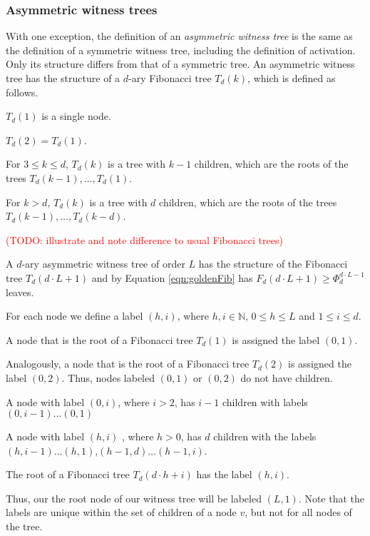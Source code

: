 \documentclass[a4paper,12pt]{article}
\newcommand\todo[1]{\textcolor{red}{(TODO: #1)}}
\begin{document}
\subsubsection{Asymmetric witness trees}
\label{sec:analysis:definitionAsymWT}
With one exception, the definition of an \emph{asymmetric witness tree} is the same as the definition of a symmetric witness tree, including the definition of activation. Only its structure differs from that of a symmetric tree. An asymmetric witness tree has the structure of a $d$-ary Fibonacci tree $T_d\left(k \right)$, which is defined as follows.
\begin{compactitem}
\item $T_d(1)$ is a single node.
\item $T_d(2) = T_d(1)$.
\item For $3\leq k \leq d$, $T_d(k)$ is a tree with $k-1$ children, which are the roots of the trees $T_d(k-1),\ldots,T_d(1)$.
\item For $k>d$, $T_d(k)$ is a tree with $d$ children, which are the roots of the trees $T_d(k-1),\ldots,T_d(k-d)$.
\end{compactitem}
\todo{illustrate and note difference to usual Fibonacci trees}

A $d$-ary asymmetric witness tree of order $L$ has the structure of the Fibonacci tree $T_d(d \cdot L+1)$ and by Equation \ref{eqn:goldenFib} has $F_d(d\cdot L + 1) \geq \Phi_d^{d\cdot L-1}$ leaves. 

For each node we define a label $(h, i)$, where $h, i \in \mathbb{N}$, $0 \leq h \leq L$ and  $1\leq i \leq d$. 
\begin{compactitem}
\item A node that is the root of a Fibonacci tree $T_d(1)$ is assigned the label $(0,1)$.
\item Analogously, a node that is the root of a Fibonacci tree $T_d(2)$ is assigned the label $(0,2)$. Thus, nodes labeled $(0,1)$ or $(0,2)$ do not have children.
\item A node with label $(0, i)$, where $i>2$, has $i-1$ children with labels $(0,i-1)\dots (0,1)$
\item A node with label $(h,i)$ , where $h>0$, has $d$ children with the labels $(h,i-1)\dots(h,1)$,$(h-1,d)\dots(h-1, i)$.
\item The root of a Fibonacci tree $T_d(d\cdot h+i)$ has the label $(h, i)$. 
\end{compactitem}
Thus, our the root node of our witness tree will be labeled $(L, 1)$. Note that the labels are unique within the set of children of a node $v$, but not for all nodes of the tree.
\end{document}
